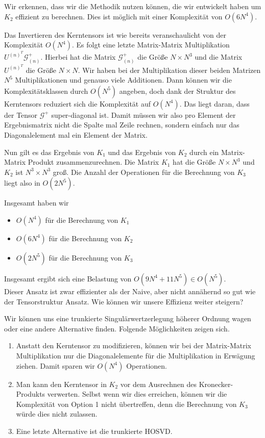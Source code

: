 Wir erkennen, dass wir die Methodik nutzen können, die wir entwickelt haben um $K_2$ effizient zu berechnen. Dies ist möglich mit einer Komplexität von $O(6N^4)$.

Das Invertieren des Kerntensors ist wie bereits veranschaulicht von der Komplexität $O(N^4)$.
Es folgt eine letzte Matrix-Matrix Multiplikation $U^{ (n) ^{T} }  \mathscr{G}^{+}_{(n)}$. Hierbei hat die Matrix $ \mathscr{G}^{+}_{(n)}$ die Größe $N \times N^3$ und die Matrix  $U^{ (n) ^{T} }$ die Größe $N \times N$.  Wir haben bei der Multiplikation dieser beiden Matrizen $N^5$ Multiplikationen und genauso viele Additionen. Dann können wir die Komplexitätsklassen durch $O(N^5)$ angeben, doch dank der Struktur des Kerntensors reduziert sich die Komplexität auf $O(N^4)$. Das liegt daran, dass der Tensor $ \mathscr{G}^{+}$ super-diagonal ist. Damit müssen wir also pro Element der Ergebnismatrix nicht die Spalte mal Zeile rechnen, sondern einfach nur das Diagonalelement mal ein Element der Matrix. 

Nun gilt es das Ergebnis von $K_1$ und das Ergebnis von $K_2$ durch ein Matrix-Matrix Produkt zusammenzurechnen. Die Matrix $K_1$ hat die Größe $N \times N^3$ und $K_2$ ist $N^3 \times N^3$ groß. 
Die Anzahl der Operationen für die Berechnung von $K_3$ liegt also in $O(2N^{5})$.

Insgesamt haben wir
\begin{itemize}
\item $O(N^4)$ für die Berechnung von $K_1$
\item $O(6N^4)$ für die Berechnung von $K_2$
\item $O(2N^{5})$ für die Berechnung von $K_3$
\end{itemize}

Insgesamt ergibt sich eine Belastung von $O(9N^4+11N^{5}) \in O(N^5)$. \\ Dieser Ansatz ist zwar effizienter als der Naive, aber nicht annähernd so gut wie der Tensorstruktur Ansatz. Wie können wir unsere Effizienz weiter steigern?

Wir können uns eine trunkierte Singulärwertzerlegung höherer Ordnung  wagen oder eine andere Alternative finden. Folgende Möglichkeiten zeigen sich.

\begin{enumerate}
\item Anstatt den Kerntensor zu modifizieren, können wir bei der Matrix-Matrix Multiplikation nur die Diagonalelemente für die Multiplikation in Erwägung ziehen. Damit sparen wir $O(N^4)$ Operationen.

\item Man kann den Kerntensor in $K_2$ vor dem Ausrechnen des Kronecker-Produkts verwerten. Selbst wenn wir dies erreichen, können wir die Komplexität von Option 1 nicht übertreffen, denn die Berechnung von $K_3$ würde dies nicht zulassen.

\item Eine letzte Alternative ist die trunkierte HOSVD.

\end{enumerate}

